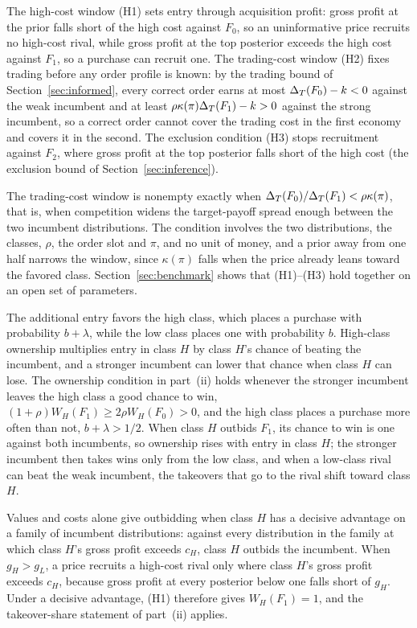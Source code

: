 The high-cost window (H1) sets entry through acquisition profit: gross
profit at the prior falls short of the high cost against \(F_0\), so an uninformative price recruits no high-cost
rival, while gross profit at the top posterior exceeds the high cost against \(F_1\), so a purchase can recruit
one. The trading-cost window (H2) fixes trading before any order profile is known: by the trading bound of
Section~\ref{sec:informed}, every correct order earns at most \(\Delta_T(F_0)-k<0\) against the weak incumbent and at
least \(\rho\kappa(\pi)\Delta_T(F_1)-k>0\) against the strong incumbent, so a correct order cannot cover the trading cost
in the first economy and covers it in the second. The exclusion condition (H3) stops recruitment against \(F_2\), where gross
profit at the top posterior falls short of the high cost (the exclusion bound of Section~\ref{sec:inference}).

The trading-cost window is nonempty exactly when \(\Delta_T(F_0)/\Delta_T(F_1)<\rho\kappa(\pi)\), that is, when competition
widens the target-payoff spread enough between the two incumbent distributions. The condition involves the two
distributions, the classes, \(\rho\), the order slot and \(\pi\), and no unit of money, and a prior away from one
half narrows the window, since \(\kappa(\pi)\) falls when the price already leans toward the favored class.
Section~\ref{sec:benchmark} shows that (H1)--(H3) hold together on an open set of parameters.

The additional entry favors the high class, which places a purchase with probability \(b+\lambda\), while the low
class places one with probability \(b\). High-class ownership multiplies entry in class \(H\) by class \(H\)'s chance
of beating the incumbent, and a stronger incumbent can lower that chance when class \(H\) can lose. The ownership
condition in part~(ii) holds whenever the stronger incumbent leaves the high class a good chance to win,
\((1+\rho)W_H(F_1)\ge2\rho W_H(F_0)>0\), and the high class places a purchase more often than not,
\(b+\lambda>1/2\). When class \(H\) outbids \(F_1\), its chance to win is one against both incumbents, so ownership
rises with entry in class \(H\); the stronger incumbent then takes wins only from the low class, and when a low-class
rival can beat the weak incumbent, the takeovers that go to the rival shift toward class \(H\).

Values and costs alone give outbidding when class \(H\) has a decisive advantage on a family of incumbent
distributions: against every distribution in the family at which class \(H\)'s gross profit exceeds \(c_H\), class
\(H\) outbids the incumbent. When \(g_H>g_L\), a price recruits a high-cost rival only where class \(H\)'s gross
profit exceeds \(c_H\), because gross profit at every posterior below one falls short of \(g_H\). Under a decisive
advantage, (H1) therefore gives \(W_H(F_1)=1\), and the takeover-share statement of part~(ii) applies.

